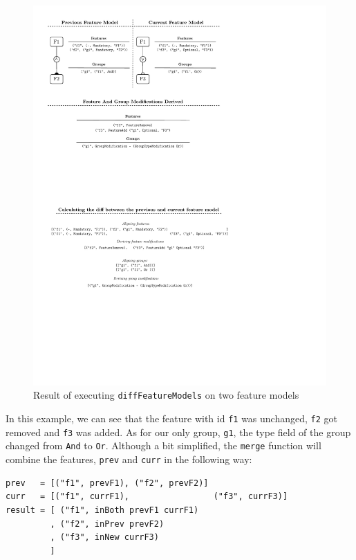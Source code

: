 \documentclass[a4paper,english]{ifimaster}
\begin{document}
\begin{figure}[htpb]
  \centering
  \includegraphics[]{feature_model_diff_visualized.pdf}
  \caption{Result of executing \texttt{diffFeatureModels} on two feature models}%
  \label{fig:diff_feature_models_visualized}
\end{figure}

In this example, we can see that the feature with id \texttt{f1} was unchanged, \texttt{f2} got removed and \texttt{f3} was added. As for our only group, \texttt{g1}, the type field of the group changed from \texttt{And} to \texttt{Or}. Although a bit simplified, the \texttt{merge} function will combine the features, \texttt{prev} and \texttt{curr} in the following way:

\begin{verbatim}
prev   = [("f1", prevF1), ("f2", prevF2)]
curr   = [("f1", currF1),                 ("f3", currF3)]
result = [ ("f1", inBoth prevF1 currF1)
         , ("f2", inPrev prevF2)
         , ("f3", inNew currF3)
         ]
\end{verbatim}
\end{document}
